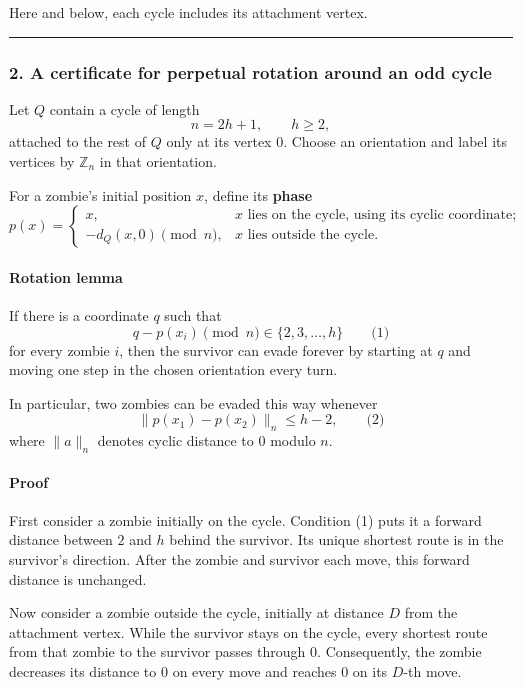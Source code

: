 \documentclass[
  11pt,
  a4paper,
]{article}
\begin{document}
Here and below, each cycle includes its attachment vertex.

\begin{center}\rule{0.5\linewidth}{0.5pt}\end{center}

\subsubsection{2. A certificate for perpetual rotation around an odd
cycle}\label{a-certificate-for-perpetual-rotation-around-an-odd-cycle}

Let \(Q\) contain a cycle of length \[
n=2h+1,\qquad h\ge2,
\] attached to the rest of \(Q\) only at its vertex \(0\). Choose an
orientation and label its vertices by \(\mathbb Z_n\) in that
orientation.

For a zombie's initial position \(x\), define its \textbf{phase} \[
p(x)=
\begin{cases}
x, & x\text{ lies on the cycle, using its cyclic coordinate};\\[2mm]
-d_Q(x,0)\pmod n, & x\text{ lies outside the cycle}.
\end{cases}
\]

\paragraph{Rotation lemma}\label{rotation-lemma}

If there is a coordinate \(q\) such that \[
q-p(x_i)\pmod n\in\{2,3,\ldots,h\}
\qquad\text{(1)}
\] for every zombie \(i\), then the survivor can evade forever by
starting at \(q\) and moving one step in the chosen orientation every
turn.

In particular, two zombies can be evaded this way whenever \[
\|p(x_1)-p(x_2)\|_n\le h-2,
\qquad\text{(2)}
\] where \(\|a\|_n\) denotes cyclic distance to \(0\) modulo \(n\).

\paragraph{Proof}\label{proof}

First consider a zombie initially on the cycle. Condition (1) puts it a
forward distance between \(2\) and \(h\) behind the survivor. Its unique
shortest route is in the survivor's direction. After the zombie and
survivor each move, this forward distance is unchanged.

Now consider a zombie outside the cycle, initially at distance \(D\)
from the attachment vertex. While the survivor stays on the cycle, every
shortest route from that zombie to the survivor passes through \(0\).
Consequently, the zombie decreases its distance to \(0\) on every move
and reaches \(0\) on its \(D\)-th move.
\end{document}
